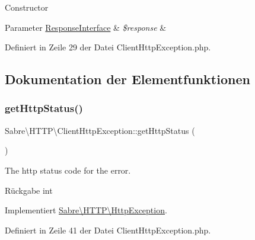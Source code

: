 Constructor


\begin{DoxyParams}[1]{Parameter}
\mbox{\hyperlink{interface_sabre_1_1_h_t_t_p_1_1_response_interface}{Response\+Interface}} & {\em \$response} & \\
\hline
\end{DoxyParams}


Definiert in Zeile 29 der Datei Client\+Http\+Exception.\+php.



\subsection{Dokumentation der Elementfunktionen}
\mbox{\label{class_sabre_1_1_h_t_t_p_1_1_client_http_exception_a1112cedae2996f53423d24c2f0193a12}} 
\subsubsection{\texorpdfstring{get\+Http\+Status()}{getHttpStatus()}}
{\footnotesize\ttfamily Sabre\textbackslash{}\+H\+T\+T\+P\textbackslash{}\+Client\+Http\+Exception\+::get\+Http\+Status (\begin{DoxyParamCaption}{ }\end{DoxyParamCaption})}

The http status code for the error.

\begin{DoxyReturn}{Rückgabe}
int 
\end{DoxyReturn}


Implementiert \mbox{\hyperlink{interface_sabre_1_1_h_t_t_p_1_1_http_exception_a3f276c42a877c12d0fe55b644e9dad73}{Sabre\textbackslash{}\+H\+T\+T\+P\textbackslash{}\+Http\+Exception}}.



Definiert in Zeile 41 der Datei Client\+Http\+Exception.\+php.

\mbox{\label{class_sabre_1_1_h_t_t_p_1_1_client_http_exception_a4fe80b9618406e2abdeccd0ff027f665}} 
